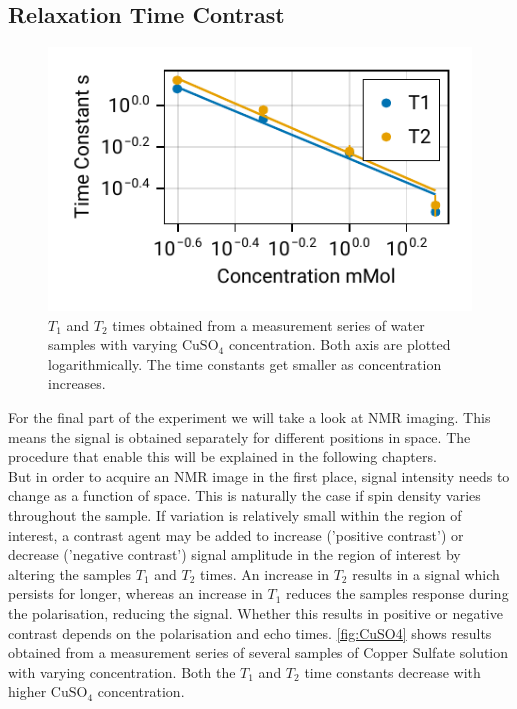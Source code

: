 \documentclass[
    parskip=half, 
    twoside=false,
    twocolumn=true,
    fontsize=11pt,
]{scrarticle}
\begin{document}
\subsection{Relaxation Time Contrast}
\begin{figure}
    \centering
    \includegraphics{figures/06 contrast.pdf}
    \caption{$T_1$ and $T_2$ times obtained from a measurement series of water samples with varying $\text{CuSO}_4$ concentration. Both axis are plotted logarithmically. The time constants get smaller as concentration increases.}
    \label{fig:CuSO4}
\end{figure}
For the final part of the experiment we will take a look at NMR imaging. This means the signal is obtained separately for different positions in space. The procedure that enable this will be explained in the following chapters.\\
But in order to acquire an NMR image in the first place, signal intensity needs to change as a function of space. This is naturally the case if spin density varies throughout the sample. If variation is relatively small within the region of interest, a contrast agent may be added to increase ('positive contrast') or decrease ('negative contrast') signal amplitude in the region of interest by altering the samples $T_1$ and $T_2$ times. An increase in $T_2$ results in a signal which persists for longer, whereas an increase in $T_1$ reduces the samples response during the polarisation, reducing the signal. Whether this results in positive or negative contrast depends on the polarisation and echo times. \autoref{fig:CuSO4} shows results obtained from a measurement series of several samples of Copper Sulfate solution with varying concentration. Both the $T_1$ and $T_2$ time constants decrease with higher $\text{CuSO}_4$ concentration.
\end{document}
